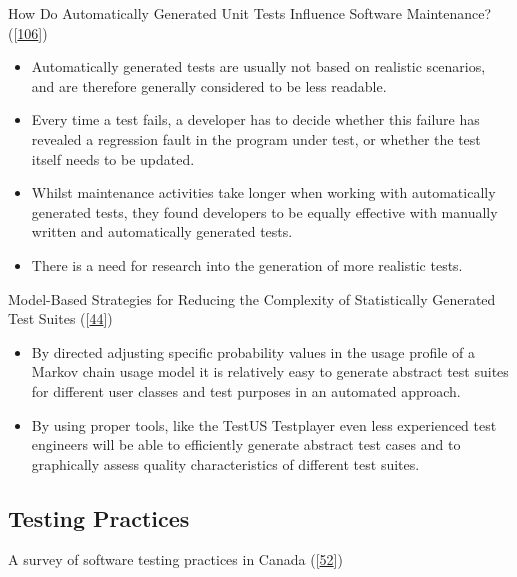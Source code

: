 \documentclass[]{book}
\providecommand{\tightlist}{%
  \setlength{\itemsep}{0pt}\setlength{\parskip}{0pt}}
\begin{document}
How Do Automatically Generated Unit Tests Influence Software
Maintenance?
({[}\protect\hyperlink{ref-shamshiri2018automatically}{106}{]})

\begin{itemize}
\tightlist
\item
  Automatically generated tests are usually not based on realistic
  scenarios, and are therefore generally considered to be less readable.
\item
  Every time a test fails, a developer has to decide whether this
  failure has revealed a regression fault in the program under test, or
  whether the test itself needs to be updated.
\item
  Whilst maintenance activities take longer when working with
  automatically generated tests, they found developers to be equally
  effective with manually written and automatically generated tests.
\item
  There is a need for research into the generation of more realistic
  tests.
\end{itemize}

Model-Based Strategies for Reducing the Complexity of Statistically
Generated Test Suites ({[}\protect\hyperlink{ref-dulz2013model}{44}{]})

\begin{itemize}
\tightlist
\item
  By directed adjusting specific probability values in the usage profile
  of a Markov chain usage model it is relatively easy to generate
  abstract test suites for different user classes and test purposes in
  an automated approach.
\item
  By using proper tools, like the TestUS Testplayer even less
  experienced test engineers will be able to efficiently generate
  abstract test cases and to graphically assess quality characteristics
  of different test suites.
\end{itemize}

\subsection{Testing Practices}\label{testing-practices}

A survey of software testing practices in Canada
({[}\protect\hyperlink{ref-GAROUSI20131354}{52}{]})
\end{document}
